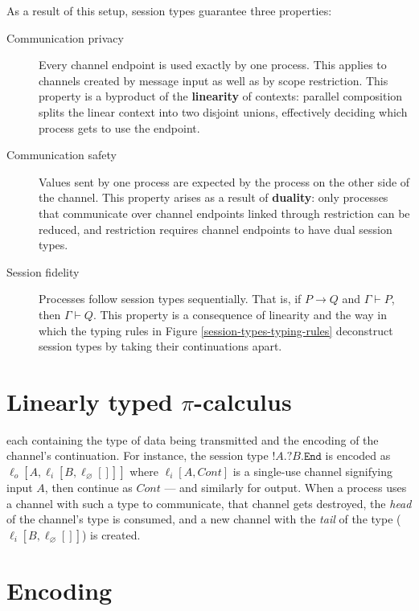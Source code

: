 \documentclass{mproj}
\newcommand{\picalc}{$\pi$-calculus}
\newcommand{\type}{\texttt}
\newcommand{\End}{\type{End}}
\newcommand{\Send}[1]{!#1.}
\newcommand{\Recv}[1]{?#1.}
\newcommand{\reduce}{\rightarrow}
\renewcommand{\emptyset}{\varnothing}
\newcommand{\types}{\vdash}
\begin{document}
As a result of this setup, session types guarantee three properties:
\begin{description}
    \item [Communication privacy] Every channel endpoint is used exactly by one process. This applies to channels created by message input as well as by scope restriction. This property is a byproduct of the \textbf{linearity} of contexts: parallel composition splits the linear context into two disjoint unions, effectively deciding which process gets to use the endpoint.
        
    \item [Communication safety] Values sent by one process are expected by the process on the other side of the channel. This property arises as a result of \textbf{duality}: only processes that communicate over channel endpoints linked through restriction can be reduced, and restriction requires channel endpoints to have dual session types.

    \item [Session fidelity] Processes follow session types sequentially. That is, if $P \reduce Q$ and $\Gamma \types P$, then $\Gamma \types Q$. This property is a consequence of linearity and the way in which the typing rules in Figure \ref{session-types-typing-rules} deconstruct session types by taking their continuations apart.
\end{description}

\section{Linearly typed \picalc{}}\label{linear-picalc}

\todo{}

 each containing the type of data being transmitted and the encoding of the channel's continuation. For instance, the session type $\Send{A} \Recv{B} \End$ is encoded as $\ell_o [A,\ell_i [B,\ell_\emptyset []]]$ where $\ell_i [A, Cont]$ is a single-use channel signifying input $A$, then continue as $Cont$ --- and similarly for output. When a process uses a channel with such a type to communicate, that channel gets destroyed, the \emph{head} of the channel's type is consumed, and a new channel with the \emph{tail} of the type ($\ell_i [B, \ell_\emptyset []]$) is created.

\section{Encoding}\label{continuation-passing}
\end{document}

